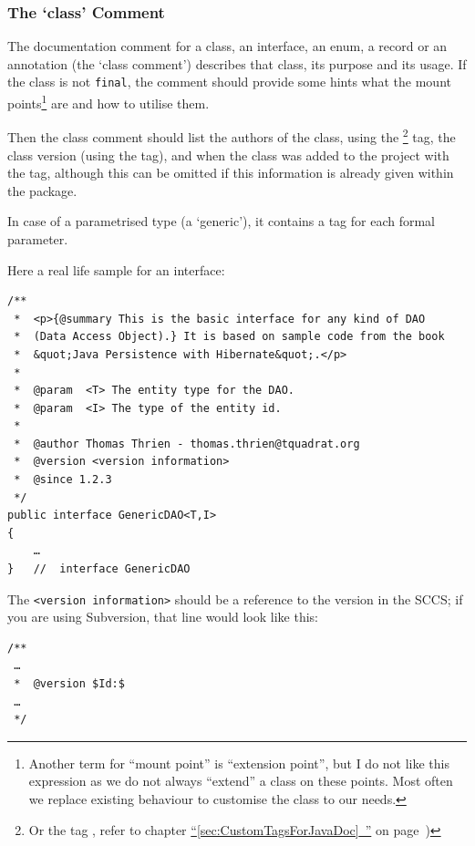 \documentclass[11pt,a4paper, titlepage, parskip=half, headsepline, footsepline, cleardoublepage=current, headheight=1cm]{scrbook}
\newcommand*{\tqfullvref}[1]{\hyperref[{#1}]{“\ref*{#1}~\nameref*{#1}”} on page~\pageref{#1}}
\begin{document}

\subsubsection{The ‘class’ Comment}\label{sec:ClassComment}
The documentation comment for a class, an interface, an enum, a record or an annotation (the ‘class comment’) describes that class, its purpose and its usage. If the class is not \lstinline|final|, the comment should provide some hints what the mount points\footnote{Another term for “mount point” is “extension point”, but I do not like this expression as we do not always “extend” a class on these points. Most often we replace existing behaviour to customise the class to our needs.} are and how to utilise them.

Then the class comment should list the authors of the class, using the \footnote{Or the tag , refer to chapter \tqfullvref{sec:CustomTagsForJavaDoc})} tag, the class version (using the  tag), and when the class was added to the project with the  tag, although this can be omitted if this information is already given within the package.

In case of a parametrised type (a ‘generic’), it contains a  tag for each formal parameter.

Here a real life sample for an interface:
\begin{lstlisting}
/**
 *  <p>{@summary This is the basic interface for any kind of DAO 
 *  (Data Access Object).} It is based on sample code from the book 
 *  &quot;Java Persistence with Hibernate&quot;.</p>
 *
 *  @param  <T> The entity type for the DAO.
 *  @param  <I> The type of the entity id.
 *
 *  @author Thomas Thrien - thomas.thrien@tquadrat.org
 *  @version <version information>
 *  @since 1.2.3
 */
public interface GenericDAO<T,I>
{
    …
}   //  interface GenericDAO
\end{lstlisting}

The \verb#<version information># should be a reference to the version in the SCCS; if you are using Subversion, that line would look like this:
\begin{lstlisting}
/**
 …
 *  @version $Id:$
 …
 */
\end{lstlisting}
\end{document}
